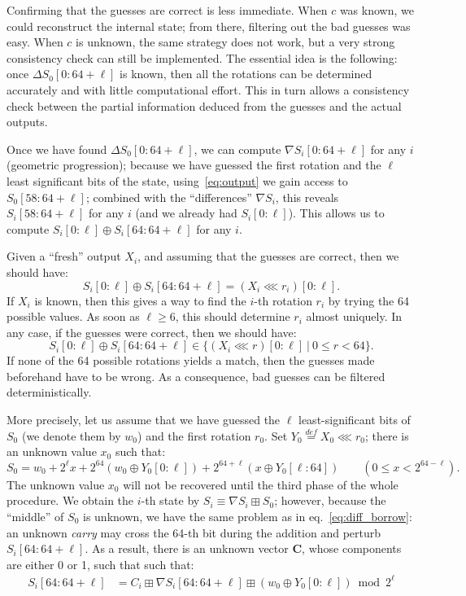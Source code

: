 \documentclass[preprint,svgnames]{iacrtrans}
\begin{document}
Confirming that the guesses are correct is less immediate. When $c$ was known,
we could reconstruct the internal state; from there, filtering out the bad
guesses was easy. When $c$ is unknown, the same strategy does not work, but a
very strong consistency check can still be implemented. The essential idea is
the following: once $\Delta S_0[0:64+\ell]$ is known, then all the rotations can
be determined accurately and with little computational effort. This in turn
allows a consistency check between the partial information deduced from the
guesses and the actual outputs.

Once we have found $\Delta S_0[0:64+\ell]$, we can compute
$\nabla S_i[0:64+\ell]$ for any $i$ (geometric progression); because we have
guessed the first rotation and the $\ell$ least significant bits of the state,
using~\eqref{eq:output} we gain access to $S_0[58:64+\ell]$; combined with the
``differences'' $\nabla S_i$, this reveals $S_i[58:64+\ell]$ for any $i$ (and we
already had $S_i[0:\ell]$). This allows us to compute
$S_i[0:\ell] \oplus S_i[64:64+\ell]$ for any $i$.

Given a ``fresh'' output $X_i$, and assuming that the guesses are correct, then we should have:
\begin{equation}\label{eq:find_rotation}
  S_i[0:\ell] \oplus S_i[64:64+\ell] = (X_i \lll r_i)[0:\ell].
\end{equation}
If $X_i$ is known, then this gives a way to find the $i$-th rotation $r_i$ by
trying the 64 possible values. As soon as $\ell \geq 6$, this should determine
$r_i$ almost uniquely. In any case, if the guesses were correct, then we should have:
\begin{equation}\label{eq:consistency}
  S_i[0:\ell] \oplus S_i[64:64+\ell] \in \bigl\{ (X_i \lll r)[0:\ell]~|~0 \leq r < 64 \bigr\}.
\end{equation}
If none of the 64 possible rotations yields a match, then the guesses made
beforehand have to be wrong. As a consequence, bad guesses can be filtered
deterministically.

More precisely, let us assume that we have guessed the $\ell$ least-significant
bits of $S_0$ (we denote them by $w_0$) and the first rotation $r_0$. Set
$Y_0 \stackrel{def}{=} X_0 \lll r_0$; there is an unknown value
$x_0$ such that:
\[
  S_0 = w_0 + 2^\ell x + 2^{64} (w_0 \oplus Y_0[0:\ell]) + 2^{64+\ell} (x \oplus Y_0[\ell:64]) \qquad \left(0 \leq x < 2^{64-\ell}\right).
\]
The unknown value $x_0$ will not be recovered until the third phase of the whole
procedure. We obtain the $i$-th state by $S_i \equiv \nabla S_i \boxplus S_0$;
however, because the ``middle'' of $S_0$ is unknown, we have the same problem as
in eq.~\eqref{eq:diff_borrow}: an unknown \emph{carry} may cross the 64-th bit
during the addition and perturb $S_i[64:64+\ell]$. As a result, there is an
unknown vector $\mathbf{C}$, whose components are either 0 or 1, such that such
that:
\begin{align*}
  S_i[64:64+\ell] &= C_i \boxplus \nabla S_i[64:64+\ell] \boxplus (w_0 \oplus Y_0[0:\ell]) \bmod 2^\ell \\
\end{align*}
\end{document}
